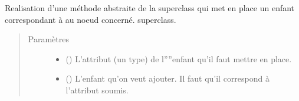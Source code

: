 \documentclass[letterpaper,10pt,french]{sphinxmanual}
\begin{document}
\begin{fulllineitems}
\begin{fulllineitems}
\begin{quote}
\begin{description}
\end{description}\end{quote}

\end{fulllineitems}


\begin{fulllineitems}
\label{\detokenize{index:StrategyTree.Repair.set_child_by_attribute}}
Realisation d’une méthode abstraite de la superclass qui met en place
un enfant correspondant à  au noeud concerné.
superclass.
\begin{quote}\begin{description}
\item[{Paramètres}] \leavevmode\begin{itemize}
\item {} 
 () \textendash{} L’attribut (un type) de l””enfant qu’il faut mettre en place.

\item {} 
 ({\hyperref[\detokenize{index:StrategyTree.NodeST}]{}}\sphinxstyleliteralemphasis{\sphinxupquote{, }}) \textendash{} L’enfant qu’on veut ajouter. Il faut qu’il correspond à l’attribut
soumis.

\end{itemize}

\end{description}\end{quote}

\end{fulllineitems}


\end{fulllineitems}

\end{document}
